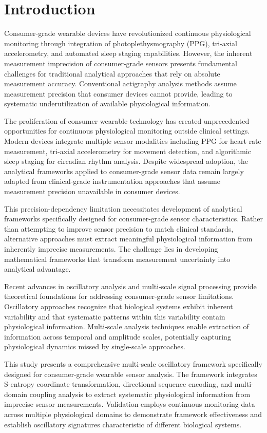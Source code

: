 \documentclass[12pt,a4paper]{article}
\theoremstyle{definition}
\begin{document}
\section{Introduction}

Consumer-grade wearable devices have revolutionized continuous physiological monitoring through integration of photoplethysmography (PPG), tri-axial accelerometry, and automated sleep staging capabilities. However, the inherent measurement imprecision of consumer-grade sensors presents fundamental challenges for traditional analytical approaches that rely on absolute measurement accuracy. Conventional actigraphy analysis methods assume measurement precision that consumer devices cannot provide, leading to systematic underutilization of available physiological information.

The proliferation of consumer wearable technology has created unprecedented opportunities for continuous physiological monitoring outside clinical settings. Modern devices integrate multiple sensor modalities including PPG for heart rate measurement, tri-axial accelerometry for movement detection, and algorithmic sleep staging for circadian rhythm analysis. Despite widespread adoption, the analytical frameworks applied to consumer-grade sensor data remain largely adapted from clinical-grade instrumentation approaches that assume measurement precision unavailable in consumer devices.

This precision-dependency limitation necessitates development of analytical frameworks specifically designed for consumer-grade sensor characteristics. Rather than attempting to improve sensor precision to match clinical standards, alternative approaches must extract meaningful physiological information from inherently imprecise measurements. The challenge lies in developing mathematical frameworks that transform measurement uncertainty into analytical advantage.

Recent advances in oscillatory analysis and multi-scale signal processing provide theoretical foundations for addressing consumer-grade sensor limitations. Oscillatory approaches recognize that biological systems exhibit inherent variability and that systematic patterns within this variability contain physiological information. Multi-scale analysis techniques enable extraction of information across temporal and amplitude scales, potentially capturing physiological dynamics missed by single-scale approaches.

This study presents a comprehensive multi-scale oscillatory framework specifically designed for consumer-grade wearable sensor analysis. The framework integrates S-entropy coordinate transformation, directional sequence encoding, and multi-domain coupling analysis to extract systematic physiological information from imprecise sensor measurements. Validation employs continuous monitoring data across multiple physiological domains to demonstrate framework effectiveness and establish oscillatory signatures characteristic of different biological systems.
\end{document}

